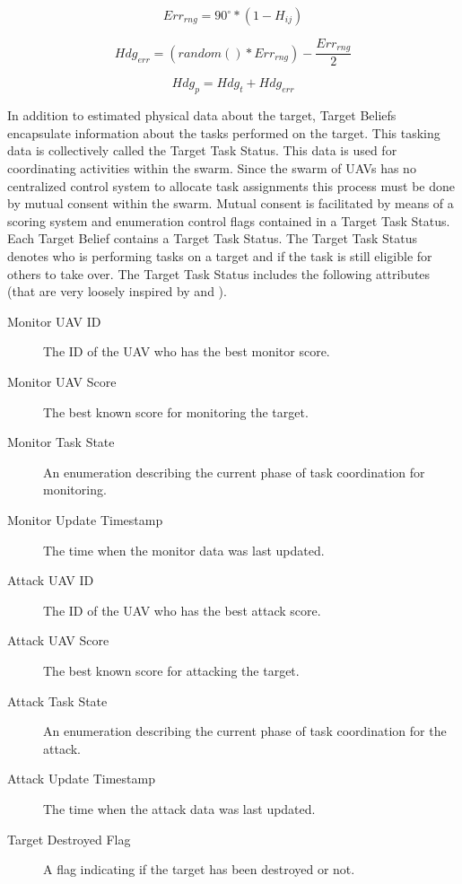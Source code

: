 \begin{equation}
\label{eq:hdg_err_rng}
Err_{rng} = 90^{\circ} * (1 - H_{ij})
\end{equation}

\begin{equation}
\label{eq:rand_hdg_err}
Hdg_{err} = (random() * Err_{rng}) - \frac{Err_{rng}}{2}
\end{equation}

\begin{equation}
Hdg_{p} = Hdg_{t} + Hdg_{err}
\end{equation}

In addition to estimated physical data about the target, Target Beliefs encapsulate information about the tasks performed on the target.  This tasking data is collectively called the Target Task Status.  This data is used for coordinating activities within the swarm.  Since the swarm of UAVs has no centralized control system to allocate task assignments this process must be done by mutual consent within the swarm.  Mutual consent is facilitated by means of a scoring system and enumeration control flags contained in a Target Task Status.  Each Target Belief contains a Target Task Status.  The Target Task Status denotes who is performing tasks on a target and if the task is still eligible for others to take over. The Target Task Status includes the following attributes (that are very loosely inspired by \textcite{wtaSurvey} and \textcite{jin}).

\begin{description}
	\item [Monitor UAV ID] The ID of the UAV who has the best monitor score.
	\item [Monitor UAV Score] The best known score for monitoring the target.
	\item [Monitor Task State] An enumeration describing the current phase of task coordination for monitoring.
	\item [Monitor Update Timestamp] The time when the monitor data was last updated.
	\item [Attack UAV ID] The ID of the UAV who has the best attack score.
	\item [Attack UAV Score] The best known score for attacking the target.
	\item [Attack Task State] An enumeration describing the current phase of task coordination for the attack.
	\item [Attack Update Timestamp] The time when the attack data was last updated.
	\item [Target Destroyed Flag] A flag indicating if the target has been destroyed or not.
\end{description}

